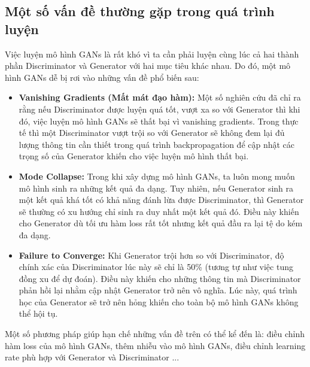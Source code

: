 {    \subsection{Một số vấn đề thường gặp trong quá trình luyện}
    Việc luyện mô hình GANs là rất khó vì ta cần phải luyện cùng lúc cả hai thành phần Discriminator và Generator với hai mục tiêu khác nhau. Do đó, một mô hình GANs dễ bị rơi vào những vấn đề phổ biến sau:
    
    \begin{itemize}[leftmargin=0cm,itemindent=.5cm,labelwidth=\itemindent,labelsep=0cm,align=left]
        \item \textbf{Vanishing Gradients (Mất mát đạo hàm):} Một số nghiên cứu đã chỉ ra rằng nếu Discriminator được luyện quá tốt, vượt xa so với Generator thì khi đó, việc luyện mô hình GANs sẽ thất bại vì vanishing gradients. Trong thực tế thì một Discriminator vượt trội so với Generator sẽ không đem lại đủ lượng thông tin cần thiết trong quá trình backpropagation để cập nhật các trọng số của Generator khiến cho việc luyện mô hình thất bại.
        \item \textbf{Mode Collapse:} Trong khi xây dựng mô hình GANs, ta luôn mong muốn mô hình sinh ra những kết quả đa dạng. Tuy nhiên, nếu Generator sinh ra một kết quả khá tốt có khả năng đánh lừa được Discriminator, thì Generator sẽ thường có xu hướng chỉ sinh ra duy nhất một kết quả đó. Điều này khiến cho Generator dù tối ưu hàm loss rất tốt nhưng kết quả đầu ra lại tệ do kém đa dạng.
        \item \textbf{Failure to Converge:} Khi Generator trội hơn so với Discriminator, độ chính xác của Discriminator lúc này sẽ chỉ là 50\% (tương tự như việc tung đồng xu để dự đoán). Điều này khiến cho những thông tin mà Discriminator phản hồi lại nhằm cập nhật Generator trở nên vô nghĩa. Lúc này, quá trình học của Generator sẽ trở nên hỏng khiến cho toàn bộ mô hình GANs không thể hội tụ.
    \end{itemize}
    Một số phương pháp giúp hạn chế những vấn đề trên có thể kể đến là: điều chỉnh hàm loss của mô hình GANs, thêm nhiễu vào mô hình GANs, điều chỉnh learning rate phù hợp với Generator và Discriminator ...
}